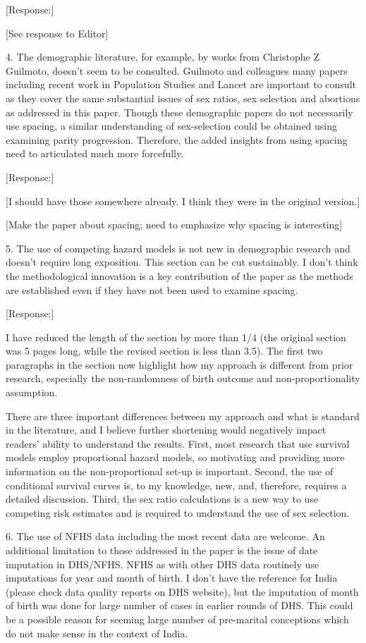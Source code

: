 \documentclass[letterpaper,12pt]{article}
\begin{document}
[Response:]

[See response to Editor]


4. The demographic literature, for example, by works from Christophe Z
Guilmoto, doesn’t seem to be consulted. Guilmoto and colleagues many
papers including recent work in Population Studies and Lancet are
important to consult as they cover the same substantial issues of sex
ratios, sex selection and abortions as addressed in this paper. Though
these demographic papers do not necessarily use spacing, a similar
understanding of sex-selection could be obtained using examining parity
progression. Therefore, the added insights from using spacing need to
articulated much more forcefully.

[Response:]

[I should have those somewhere already. I think they were in the original version.]

[Make the paper about spacing; need to emphasize why spacing is interesting]

5. The use of competing hazard models is not new in demographic research
and doesn’t require long exposition. This section can be cut
sustainably. I don’t think the methodological innovation is a key
contribution of the paper as the methods are established even if they
have not been used to examine spacing.

[Response:]

I have reduced the length of the section by more than 1/4 (the original section was 5
pages long, while the revised section is less than 3.5).
The first two paragraphs in the section now highlight how my approach is different from
prior research, especially the non-randomness of birth outcome and non-proportionality
assumption.

There are three important differences between my approach and what is standard
in the literature, and I believe further shortening would negatively impact readers'
ability to understand the results.
First, most research that use survival models employ proportional hazard models, so 
motivating and providing more information on the non-proportional set-up is important.
Second, the use of conditional survival curves is, to my knowledge, new, and, therefore,
requires a detailed discussion.
Third, the sex ratio calculations is a new way to use competing risk estimates and is 
required to understand the use of sex selection.


6. The use of NFHS data including the most recent data are welcome. An
additional limitation to those addressed in the paper is the issue of
date imputation in DHS/NFHS. NFHS as with other DHS data routinely use
imputations for year and month of birth. I don’t have the reference for
India (please check data quality reports on DHS website), but the
imputation of month of birth was done for large number of cases in
earlier rounds of DHS. This could be a possible reason for seeming large
number of pre-marital conceptions which do not make sense in the context
of India.
\end{document}
